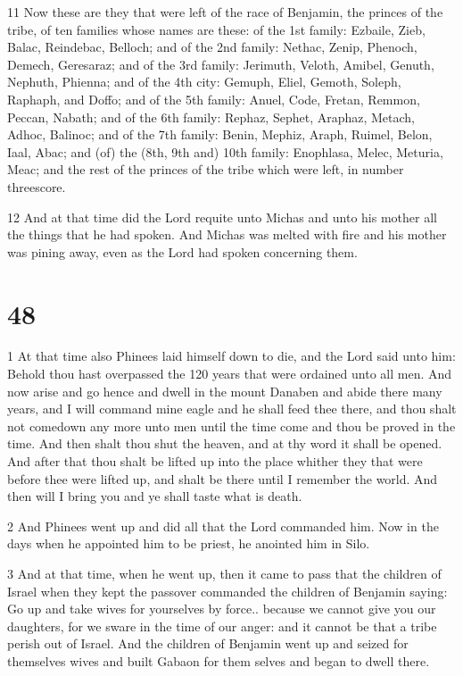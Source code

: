 \par 11 Now these are they that were left of the race of Benjamin, the princes of the tribe, of ten families whose names are these: of the 1st family: Ezbaile, Zieb, Balac, Reindebac, Belloch; and of the 2nd family: Nethac, Zenip, Phenoch, Demech, Geresaraz; and of the 3rd family: Jerimuth, Veloth, Amibel, Genuth, Nephuth, Phienna; and of the 4th city: Gemuph, Eliel, Gemoth, Soleph, Raphaph, and Doffo; and of the 5th family: Anuel, Code, Fretan, Remmon, Peccan, Nabath; and of the 6th family: Rephaz, Sephet, Araphaz, Metach, Adhoc, Balinoc; and of the 7th family: Benin, Mephiz, Araph, Ruimel, Belon, Iaal, Abac; and (of) the (8th, 9th and) 10th family: Enophlasa, Melec, Meturia, Meac; and the rest of the princes of the tribe which were left, in number threescore. 

\par 12 And at that time did the Lord requite unto Michas and unto his mother all the things that he had spoken. And Michas was melted with fire and his mother was pining away, even as the Lord had spoken concerning them.

\chapter{48}

\par 1 At that time also Phinees laid himself down to die, and the Lord said unto him: Behold thou hast overpassed the 120 years that were ordained unto all men. And now arise and go hence and dwell in the mount Danaben and abide there many years, and I will command mine eagle and he shall feed thee there, and thou shalt not comedown any more unto men until the time come and thou be proved in the time. And then shalt thou shut the heaven, and at thy word it shall be opened. And after that thou shalt be lifted up into the place whither they that were before thee were lifted up, and shalt be there until I remember the world. And then will I bring you and ye shall taste what is death. 

\par 2 And Phinees went up and did all that the Lord commanded him. Now in the days when he appointed him to be priest, he anointed him in Silo.

\par 3 And at that time, when he went up, then it came to pass that the children of Israel when they kept the passover commanded the children of Benjamin saying: Go up and take wives for yourselves by force.. because we cannot give you our daughters, for we sware in the time of our anger: and it cannot be that a tribe perish out of Israel. And the children of Benjamin went up and seized for themselves wives and built Gabaon for them selves and began to dwell there.

